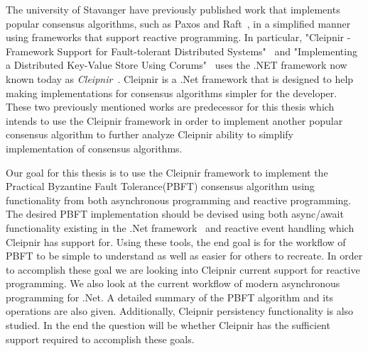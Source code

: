 The university of Stavanger have previously published work that implements popular consensus algorithms, such as Paxos and Raft~\cite{WEB:ConsesAlgo}, in a simplified manner using frameworks that support reactive programming. In particular, "Cleipnir - Framework Support for Fault-tolerant Distributed Systems"~\cite{PAPER:PaxosCleipnir} and "Implementing a Distributed Key-Value Store Using Corums"~\cite{PAPER:EivindPaper} uses the .NET framework now known today as \textit{Cleipnir}~\cite{DOC:Cleipnir}. 
Cleipnir is a .Net framework that is designed to help making implementations for consensus algorithms simpler for the developer.
These two previously mentioned works are predecessor for this thesis which intends to use the Cleipnir framework in order to implement another popular consensus algorithm to further analyze Cleipnir ability to simplify implementation of consensus algorithms.

Our goal for this thesis is to use the Cleipnir framework to implement the Practical Byzantine Fault Tolerance(PBFT) consensus algorithm using functionality from both asynchronous programming and reactive programming. The desired PBFT implementation should be devised using both async/await functionality existing in the .Net framework~\cite{DOC:AsyncAwait} and reactive event handling which Cleipnir has support for. Using these tools, the end goal is for the workflow of PBFT to be simple to understand as well as easier for others to recreate. In order to accomplish these goal we are looking into Cleipnir current support for reactive programming. We also look at the current workflow of modern asynchronous programming for .Net. A detailed summary of the PBFT algorithm and its operations are also given. Additionally, Cleipnir persistency functionality is also studied.
In the end the question will be whether Cleipnir has the sufficient support required to accomplish these goals.

